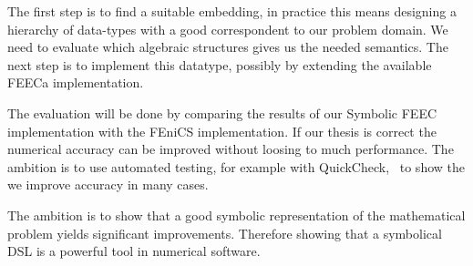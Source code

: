 \documentclass{scrartcl}
\begin{document}

The first step is to find a suitable embedding, in practice this means
designing a hierarchy of data-types with a good correspondent to our problem
domain.  We need to evaluate which algebraic structures gives us the needed
semantics. The next step is to implement this datatype, possibly by extending
the available FEECa implementation.

The evaluation will be done by comparing the results of our Symbolic FEEC
implementation with the FEniCS implementation. If our thesis is correct the
numerical accuracy can be improved without loosing to much performance.
The ambition is to use automated testing, for example with
QuickCheck,~\cite{claessen_quickcheck_2000} to show the we improve accuracy in
many cases.


The ambition is to show that a good symbolic representation of the mathematical
problem yields significant improvements. Therefore showing that a symbolical DSL
is a powerful tool in numerical software.





\end{document}
